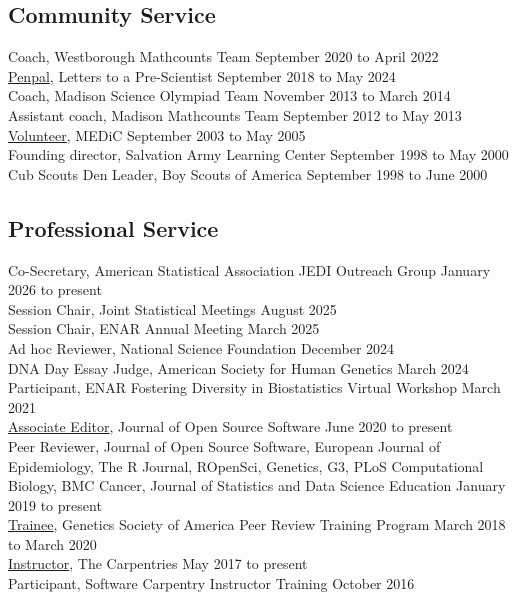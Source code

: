 \documentclass[
  10pt,
]
{article}
\begin{document}
\subsection{Community Service}\label{community-service}

\normalsize Coach, Westborough Mathcounts Team \hfill September 2020 to
April 2022\\
\normalsize \href{https://www.prescientist.org/}{Penpal}, Letters to a
Pre-Scientist \hfill September 2018 to May 2024\\
\normalsize Coach, Madison Science Olympiad Team \hfill November 2013 to
March 2014\\
\normalsize Assistant coach, Madison Mathcounts Team \hfill September
2012 to May 2013\\
\normalsize \href{https://www.med.wisc.edu/education/medic/}{Volunteer},
MEDiC \hfill September 2003 to May 2005\\
\normalsize Founding director, Salvation Army Learning Center
\hfill September 1998 to May 2000\\
\normalsize Cub Scouts Den Leader, Boy Scouts of America
\hfill September 1998 to June 2000

\subsection{Professional Service}\label{professional-service}

\normalsize Co-Secretary, American Statistical Association JEDI Outreach
Group \hfill January 2026 to present\\
\normalsize Session Chair, Joint Statistical Meetings \hfill August
2025\\
\normalsize Session Chair, ENAR Annual Meeting \hfill March 2025\\
\normalsize Ad hoc Reviewer, National Science Foundation \hfill December
2024\\
\normalsize DNA Day Essay Judge, American Society for Human Genetics
\hfill March 2024\\
\normalsize Participant, ENAR Fostering Diversity in Biostatistics
Virtual Workshop \hfill March 2021\\
\normalsize \href{https://joss.theoj.org/about}{Associate Editor},
Journal of Open Source Software \hfill June 2020 to present\\
\normalsize Peer Reviewer, Journal of Open Source Software, European
Journal of Epidemiology, The R Journal, ROpenSci, Genetics, G3, PLoS
Computational Biology, BMC Cancer, Journal of Statistics and Data
Science Education \hfill January 2019 to present\\
\normalsize \href{http://genestogenomes.org/learning-to-peer-review-program-update/}{Trainee},
Genetics Society of America Peer Review Training Program \hfill March
2018 to March 2020\\
\normalsize \href{https://carpentries.org/instructors/}{Instructor}, The
Carpentries \hfill May 2017 to present\\
\normalsize Participant, Software Carpentry Instructor Training
\hfill October 2016
\end{document}
